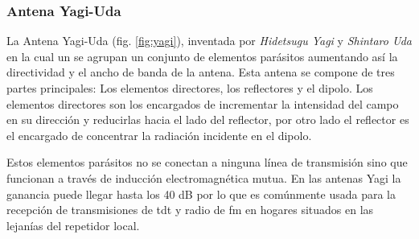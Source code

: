 \subsubsection{Antena Yagi-Uda}

La Antena Yagi-Uda (fig. \ref{fig:yagi}), inventada por \textit{Hidetsugu Yagi} y \textit{Shintaro Uda} en la cual un se agrupan un conjunto de elementos parásitos aumentando así la directividad y el ancho de banda de la antena. Esta antena se compone de tres partes principales: Los elementos directores, los reflectores y el dipolo. Los elementos directores son los encargados de incrementar la intensidad del campo en su dirección y reducirlas hacia el lado del reflector, por otro lado el reflector es el encargado de concentrar la radiación incidente en el dipolo. 
\\
\par Estos elementos parásitos no se conectan a  ninguna línea de transmisión sino que funcionan a través de inducción electromagnética mutua. En las antenas Yagi la ganancia puede llegar hasta los 40 dB por lo que es comúnmente usada para la recepción de transmisiones de \gls{tdt} y radio de \gls{fm} en hogares situados en las lejanías del repetidor local.



